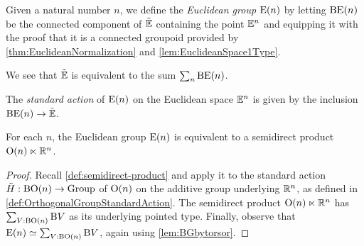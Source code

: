 \begin{definition}\label{def:EuclideanGroup}
  Given a natural number $n$, we define the {\em Euclidean group} $\mathrm{E}(n)$ by
  letting $\mathrm{B} \mathrm{E}(n)$ be the connected component of ${\tilde {\mathbb E}}$ containing the
  point $\mathbb E^n$ and equipping it with the proof that it is a connected
  groupoid provided by \cref{thm:EuclideanNormalization} and
  \cref{lem:EuclideanSpace1Type}.
\end{definition}

We see that ${\tilde {\mathbb E}}$ is equivalent to the sum $\sum_n \mathrm{B} \mathrm{E}(n)$.

\begin{definition}\label{def:EuclideanGroupStandardAction}
  The {\em standard action} of $\mathrm{E}(n)$ on the Euclidean space $\mathbb E^n$ is given
  by the inclusion $\mathrm{B} \mathrm{E}(n) \to {\tilde {\mathbb E}}$.
\end{definition}

\begin{theorem}\label{thm:EuclideanGroupSemidirect}
  For each $n$, the Euclidean group $\mathrm{E}(n)$ is equivalent to a semidirect
  product $\mathrm{O}(n) \ltimes \mathbb{R}^n$.
\end{theorem}

\begin{proof}
  Recall \cref{def:semidirect-product} and apply it to the standard action
  $\tilde H : \mathrm{B} \mathrm{O}(n) \to \mathrm{Group}$ of $\mathrm{O}(n)$ on the additive group
  underlying $\mathbb{R}^n$, as defined in \cref{def:OrthogonalGroupStandardAction}.
  The semidirect product $\mathrm{O}(n) \ltimes \mathbb{R}^n$ has
  $\sum_{V:\mathrm{B} \mathrm{O}(n)} \mathrm{B} V$ as its underlying pointed type.
  Finally, observe that $\mathrm{E}(n) \simeq \sum_{V:\mathrm{B} \mathrm{O}(n)} \mathrm{B} V$, again
  using \cref{lem:BGbytorsor}.
\end{proof}
